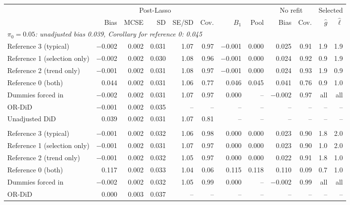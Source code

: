 \begin{tabular}{l rrrrr rr rr rr}
\toprule
 & \multicolumn{5}{c}{Post-Lasso} & & & \multicolumn{2}{c}{No refit} & \multicolumn{2}{c}{Selected} \\
\cmidrule(lr){2-6} \cmidrule(lr){9-10} \cmidrule(lr){11-12}
 & Bias & MCSE & SD & SE/SD & Cov. & $B_1$ & Pool & Bias & Cov. & $\hat g$ & $\hat\ell$ \\
\midrule
\multicolumn{12}{l}{\emph{$\pi_0=0.05$: unadjusted bias 0.039, Corollary for reference 0: 0.045}} \\
\quad Reference 3 (typical) & $-$0.002 & 0.002 & 0.031 & 1.07 & 0.97 & $-$0.001 & 0.000 & 0.025 & 0.91 & 1.9 & 1.9 \\
\quad Reference 1 (selection only) & $-$0.002 & 0.002 & 0.030 & 1.08 & 0.96 & $-$0.001 & 0.000 & 0.024 & 0.92 & 0.9 & 1.9 \\
\quad Reference 2 (trend only) & $-$0.001 & 0.002 & 0.031 & 1.08 & 0.97 & $-$0.001 & 0.000 & 0.024 & 0.93 & 1.9 & 0.9 \\
\quad Reference 0 (both) & 0.044 & 0.002 & 0.031 & 1.06 & 0.77 & 0.046 & 0.045 & 0.041 & 0.76 & 0.9 & 1.0 \\
\quad Dummies forced in & $-$0.002 & 0.002 & 0.031 & 1.07 & 0.97 & 0.000 & -- & $-$0.002 & 0.97 & all & all \\
\quad OR-DiD & $-$0.001 & 0.002 & 0.035 & -- & -- & -- & -- & -- & -- & -- & -- \\
\quad Unadjusted DiD & 0.039 & 0.002 & 0.031 & 1.07 & 0.81 & -- & -- & -- & -- & -- & -- \\
\addlinespace
\multicolumn{12}{l}{\emph{$\pi_0=0.15$: unadjusted bias 0.108, Corollary for reference 0: 0.119}} \\
\quad Reference 3 (typical) & $-$0.001 & 0.002 & 0.032 & 1.06 & 0.98 & 0.000 & 0.000 & 0.023 & 0.90 & 1.8 & 2.0 \\
\quad Reference 1 (selection only) & $-$0.001 & 0.002 & 0.031 & 1.07 & 0.97 & 0.000 & 0.000 & 0.023 & 0.90 & 1.0 & 2.0 \\
\quad Reference 2 (trend only) & $-$0.001 & 0.002 & 0.032 & 1.05 & 0.97 & 0.000 & 0.000 & 0.022 & 0.91 & 1.8 & 1.0 \\
\quad Reference 0 (both) & 0.117 & 0.002 & 0.033 & 1.04 & 0.06 & 0.115 & 0.118 & 0.110 & 0.09 & 0.7 & 1.0 \\
\quad Dummies forced in & $-$0.002 & 0.002 & 0.032 & 1.05 & 0.99 & 0.000 & -- & $-$0.002 & 0.99 & all & all \\
\quad OR-DiD & 0.000 & 0.003 & 0.037 & -- & -- & -- & -- & -- & -- & -- & -- \\

\end{tabular}
